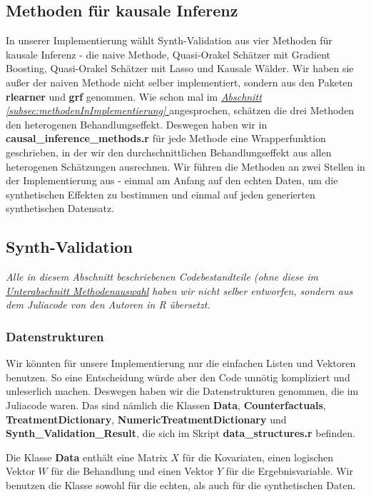 \documentclass[12pt,a4paper,twoside]{scrartcl}
\numberwithin{equation}{section}
\newcommand{\refsec}[1]{\emph{\hyperref[#1]{Abschnitt \ref*{#1} }}}
\begin{document}
  	\subsection{Methoden für kausale Inferenz}\label{subsec:methodenKausaleInferenz}
  	In unserer Implementierung wählt  Synth-Validation aus vier Methoden für kausale Inferenz - die naive Methode, Quasi-Orakel Schätzer mit Gradient Boosting, Quasi-Orakel Schätzer mit Lasso und Kausale Wälder. Wir haben sie außer der naiven Methode nicht selber implementiert, sondern aus den Paketen \textbf{rlearner} und  \textbf{grf} genommen. Wie schon mal im \refsec{subsec:methodenInImplementierung} angesprochen, schätzen die drei Methoden den heterogenen Behandlungseffekt. Deswegen haben wir in \textbf{causal\_inference\_methods.r} für jede Methode eine Wrapperfunktion geschrieben, in der wir den durchschnittlichen Behandlungseffekt aus allen heterogenen Schätzungen ausrechnen. Wir führen die Methoden an zwei Stellen in der Implementierung aus - einmal am Anfang auf den echten Daten, um die synthetischen Effekten zu bestimmen und einmal auf jeden generierten synthetischen Datensatz. \par
\subsection{Synth-Validation}\label{subsec:synthValidation}
\noindent
\emph{Alle in diesem Abschnitt beschriebenen Codebestandteile (ohne diese im  \emph{\hyperref[subsubsec:methodenauswahl]{Unterabschnitt Methodenauswahl}} haben wir nicht selber entworfen, sondern aus dem Juliacode von den Autoren in R übersetzt.} \par
\subsubsection{Datenstrukturen}\label{subsubsec:datenstrukturen}

Wir könnten für unsere Implementierung nur die einfachen Listen und Vektoren benutzen. So eine Entscheidung würde aber den Code unnötig kompliziert und unleserlich machen. Deswegen haben wir die Datenstrukturen genommen, die im Juliacode waren. Das sind nämlich die Klassen \textbf{Data}, \textbf{Counterfactuals}, \textbf{TreatmentDictionary}, \textbf{NumericTreatmentDictionary} und \textbf{Synth\_Validation\_Result}, die sich im Skript \textbf{data\_structures.r} befinden.\par 

\noindent
Die Klasse \textbf{Data} enthält  eine Matrix $X$ für die Kovariaten, einen logischen Vektor $W$ für die Behandlung und einen Vektor $Y$ für die Ergebnisvariable. Wir benutzen die Klasse sowohl für die echten, als auch für die synthetischen Daten.\par 
\end{document}
